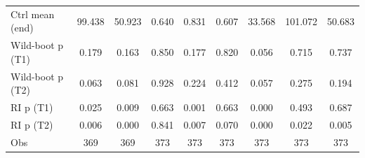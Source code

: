 {\begin{tabular}{l*{8}{c}}
Ctrl mean (end)     &      99.438         &      50.923         &       0.640         &       0.831         &       0.607         &      33.568         &     101.072         &      50.683         \\
Wild-boot p (T1)    &       0.179         &       0.163         &       0.850         &       0.177         &       0.820         &       0.056         &       0.715         &       0.737         \\
Wild-boot p (T2)    &       0.063         &       0.081         &       0.928         &       0.224         &       0.412         &       0.057         &       0.275         &       0.194         \\
RI p (T1)           &       0.025         &       0.009         &       0.663         &       0.001         &       0.663         &       0.000         &       0.493         &       0.687         \\
RI p (T2)           &       0.006         &       0.000         &       0.841         &       0.007         &       0.070         &       0.000         &       0.022         &       0.005         \\
Obs                 &         369         &         369         &         373         &         373         &         373         &         373         &         373         &         373         \\
\bottomrule
\end{tabular}
}
